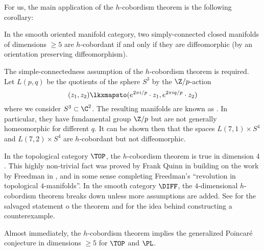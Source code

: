 For us, the main application of the $h$-cobordism theorem is the following corollary:

\begin{corollary}\label{thm:h-cobordism-diffeomorphism}
	In the smooth oriented manifold category, two simply-connected closed manifolds of dimensions $\geq 5$ are $h$-cobordant if and only if they are diffeomorphic (by an orientation preserving diffeomorphism).
\end{corollary}

\begin{remark}
	The simple-connectedness assumption of the $h$-cobordism theorem is required. Let $L(p,q)$ be the quotients of the sphere $S^3$ by the $\Z/p$-action 
	\[
		(z_1,z_2) \lkxmapsto (e^{2\pi i/p}\cdot z_1, e^{2\pi i q/p}\cdot z_2)
	\]
	where we consider $S^3\subset \C^2$. The resulting manifolds are known as .  In particular, they have fundamental group $\Z/p$ but are not generally homeomorphic for different $q$. It can be shown then that the spaces $L(7,1)\times S^4$ and $L(7,2)\times S^4$ are $h$-cobordant but not diffeomorphic. 
\end{remark}

\begin{remark}
	In the topological category $\TOP$, the $h$-cobordism theorem is true in dimension $4$. This highly non-trivial fact was proved by Frank Quinn in \cite{quinn1982} building on the work by Freedman in \cite{freedman1982manifold}, and in some sense completing Freedman's ``revolution in topological $4$-manifolds''. In the smooth category $\DIFF$, the $4$-dimensional $h$-cobordism theorem breaks down unless more assumptions are added. See \cite{cfhs1996hcobordism} for the salvaged statement o the theorem and \cite{akbulut1991} for the idea behind constructing a counterexample.
\end{remark}

Almost immediately, the $h$-cobordism theorem implies the generalized Poincar\'e conjecture in dimensions $\geq 5$ for $\TOP$ and $\PL$. 

